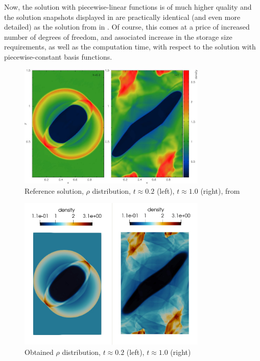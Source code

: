 Now, the solution with piecewise-linear functions is of much higher quality and the solution snapshots displayed in  are practically identical (and even more detailed) as the solution from \cite{blastNew1} in . Of course, this comes at a price of increased number of degrees of freedom, and associated increase in the storage size requirements, as well as the computation time, with respect to the solution with piecewise-constant basis functions.

\begin{figure}[H]
	\begin{center}
		\includegraphics[width=0.8\textwidth]{img/mhd-blast/new/ref.jpg}
	\caption{Reference solution, $\rho$ distribution, $t \approx 0.2$ (left), $t \approx 1.0$ (right), from \cite{blastNew1}}
	\label{figure:blastFinal}
	\end{center}
\end{figure}
\vspace{-6mm}
\begin{figure}[H]
	\begin{center}
		\includegraphics[width=0.8\textwidth]{img/mhd-blast/new/ref-result.jpg}
	\caption{Obtained $\rho$ distribution, $t \approx 0.2$ (left), $t \approx 1.0$ (right)}
	\label{figure:blastFinal}
	\end{center}
\end{figure}
\vspace{-4mm}

